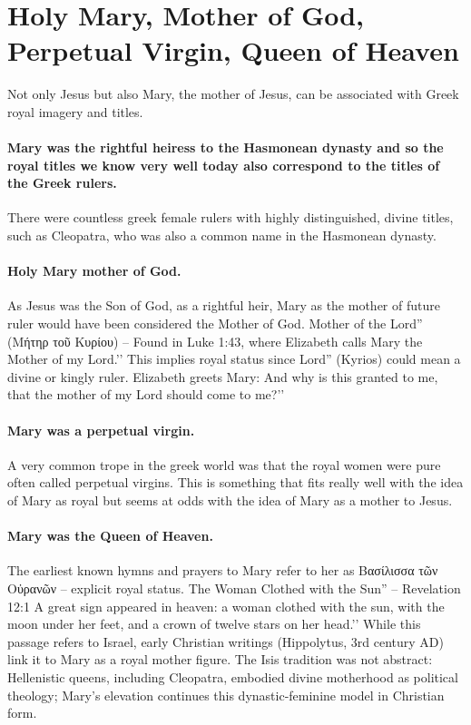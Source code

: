 \section{Holy Mary, Mother of God, Perpetual Virgin, Queen of Heaven}\label{sec:holy-mary-mother-of-god-perpetual-virgin-queen-of-heaven}
Not only Jesus but also Mary, the mother of Jesus, can be associated with Greek royal imagery and titles.
\paragraph{Mary was the rightful heiress to the Hasmonean dynasty and so the royal titles we know very well today also correspond to the titles of the Greek rulers.}\label{par:mary-was-the-rightful-heiress-to-the-hasmonean-dynasty-and-so-the-royal-titles-we-know-very-well-today-also-correspond-to-the-titles-of-the-greek-rulers.}
There were countless greek female rulers with highly distinguished, divine titles, such as Cleopatra, who was also a common name in the Hasmonean dynasty.
\paragraph{Holy Mary mother of God.}\label{par:holy-mary-mother-of-god.}
As Jesus was the Son of God, as a rightful heir, Mary as the mother of future ruler would have been considered the Mother of God.
Mother of the Lord'' (Μήτηρ τοῦ Κυρίου) -- Found in Luke 1:43, where Elizabeth calls Mary the Mother of my Lord.’’ This implies royal status since Lord'' (Kyrios) could mean a divine or kingly ruler.
Elizabeth greets Mary: And why is this granted to me, that the mother of my Lord should come to me?’’
\paragraph{Mary was a perpetual virgin.}\label{par:mary-was-a-perpetual-virgin.}
A very common trope in the greek world was that the royal women were pure often called perpetual virgins.
This is something that fits really well with the idea of Mary as royal but seems at odds with the idea of Mary as a mother to Jesus.
\paragraph{Mary was the Queen of Heaven.}\label{par:mary-was-the-queen-of-heaven.}
The earliest known hymns and prayers to Mary refer to her as Βασίλισσα τῶν Οὐρανῶν – explicit royal status.
The Woman Clothed with the Sun'' -- Revelation 12:1 A great sign appeared in heaven: a woman clothed with the sun, with the moon under her feet, and a crown of twelve stars on her head.’’ While this passage refers to Israel, early Christian writings (Hippolytus, 3rd century AD) link it to Mary as a royal mother figure. The Isis tradition was not abstract: Hellenistic queens, including Cleopatra, embodied divine motherhood as political theology; Mary’s elevation continues this dynastic-feminine model in Christian form.
